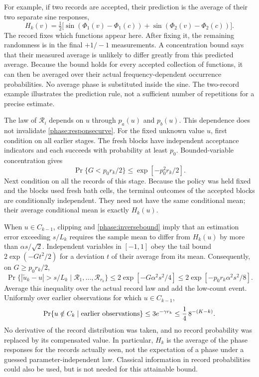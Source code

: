 \documentclass[11pt,a4paper]{article}
\numberwithin{equation}{section}
\theoremstyle{remark}
\begin{document}
For example, if two records are accepted, their prediction is the average
of their two separate sine responses,
\begin{equation}
 H_k(v)=\tfrac12\bigl[
 \sin(\Phi_1(v)-\Phi_1(c))+
 \sin(\Phi_2(v)-\Phi_2(c))\bigr].
\end{equation}
The record fixes which functions appear here.  After fixing it, the remaining
randomness is in the final $+1/-1$ measurements.  A concentration bound says
that their measured average is unlikely to differ greatly from this predicted
average.  Because the bound holds for every accepted collection of functions,
it can then be averaged over their actual frequency-dependent occurrence
probabilities.  No average phase is substituted inside the sine.
The two-record example illustrates the prediction rule, not a sufficient
number of repetitions for a precise estimate.

The law of $\mathcal R_i$ depends on $u$ through $p_a(u)$ and $p_b(u)$.
This dependence does not invalidate \eqref{phase:responsecurve}.  For the
fixed unknown value $u$, first condition on all earlier stages.  The fresh
blocks have independent acceptance indicators and each succeeds with
probability at least $p_0$.  Bounded-variable concentration gives
\begin{equation}
 \Pr\{G<p_0r_k/2\}\le\exp[-p_0^2r_k/2].
 \label{phase:counttail}
\end{equation}
Next condition on all the records of this stage.  Because the policy was
held fixed and the blocks used fresh bath cells, the terminal outcomes of
the accepted blocks are conditionally independent.  They need not have the
same conditional mean; their average conditional mean is exactly $H_k(u)$.

When $u\in C_{k-1}$, clipping and
\eqref{phase:inversebound} imply that an estimation error exceeding
$s/L_k$ requires the sample mean to differ from $H_k(u)$ by more than
$\alpha s/\sqrt2$.  Independent variables in $[-1,1]$ obey the tail bound
$2\exp(-Gt^2/2)$ for a deviation $t$ of their average from its mean.
Consequently, on $G\ge p_0r_k/2$,
\begin{equation}
 \Pr\{|\widetilde u_k-u|>s/L_k\mid\mathcal R_1,\ldots,\mathcal R_{r_k}\}
 \le2\exp[-G\alpha^2s^2/4]
 \le2\exp[-p_0r_k\alpha^2s^2/8].
 \label{phase:readouttail}
\end{equation}
Average this inequality over the actual record law and add the low-count
event.  Uniformly over earlier observations for which $u\in C_{k-1}$,
\begin{equation}
 \Pr\{u\notin C_k\mid\hbox{earlier observations}\}
 \le3e^{-\gamma r_k}
 \le\frac14\,8^{-(K-k)}.
 \label{phase:stagefailure}
\end{equation}
No derivative of the record distribution was taken, and no record
probability was replaced by its compensated value.  In particular,
$H_k$ is the average of the phase responses for the records actually seen,
not the expectation of a phase under a guessed parameter-independent law.
Classical information in record probabilities could also be used, but is
not needed for this attainable bound.
\end{document}
